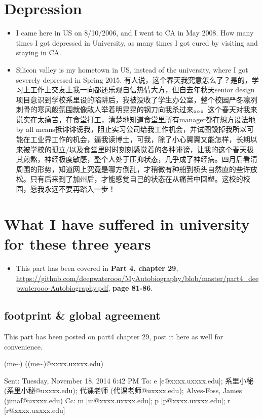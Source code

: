 \documentclass[9pt,b5paper]{article}
\begin{document}
\section{Depression}
\label{sec-5}
\begin{itemize}
\item I came here in US on 8/10/2006, and I went to CA in May 2008. How many times I got depressed in University, as many times I got cured by visiting and staying in CA.
\item Silicon valley is my hometown in US, instead of the university, where I got severely depressed in Spring 2015. 有人说，这个春天我究意怎么了？是的，学习上工作上交友上我一向都还乐观自信热情大方，但自去年秋天senior design项目意识到学校系里设的陷阱后，我被没收了学生办公室，整个校园严冬凛冽刺骨的寒风般氛围就像敌人举着明晃晃的钢刀向我杀过来。。。这个春天对我来说实在太痛苦，在食堂打工，清楚地知道食堂里所有manager都在想方设法地by all means抵诽诽谤我，阻止实习公司给我工作机会，并试图毁掉我所以可能在工业界工作的机会，逼我读博士，可我，除了小心翼翼又能怎样，长期以来被学校的孤立/以及食堂里时时刻刻感觉着的各种诽谤，让我的这个春天极其煎熬，神经极度敏感，整个人处于压抑状态，几乎成了神经病。四月后看清周围的形势，知道网上究竟是哪方倒乱，才稍微有种船到桥头自然直的些许放松。只有后来到了加州后，才能感觉自己的状态在从痛苦中回塑。这校的校园，愿我永远不要再踏入一步！
\end{itemize}

\section{What I have suffered in university for these three years}
\label{sec-6}
\begin{itemize}
\item This part has been covered in \textbf{Part 4, chapter 29}, \url{https://github.com/deepwaterooo/MyAutobiography/blob/master/part4_deepwaterooo-Autobiography.pdf}, \textbf{page 81-86}.
\end{itemize}
\subsection{footprint \& global agreement}
\label{sec-6-1}
This part has been posted on part4 chapter 29, post it here as well for convenience. 

(me\textasciitilde{}) ((me\textasciitilde{})@xxxx.uxxxx.edu)

Sent:        Tuesday, November 18, 2014 6:42 PM
To:        
e [e@xxxx.uxxxx.edu]; 系里小秘 (系里小秘@uxxxx.edu); 代课老师 (代课老师@uxxxx.edu); Alves-Foss, James (jimaf@uxxxx.edu)
Cc:        
m [m@xxxx.uxxxx.edu]; p [p@xxxx.uxxxx.edu]; r [r@xxxx.uxxxx.edu]
\end{document}
